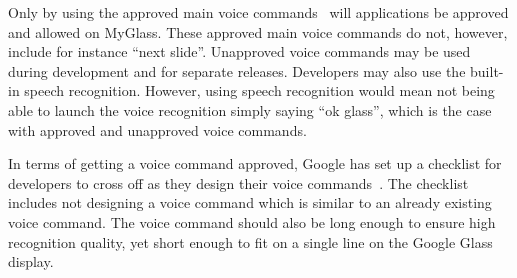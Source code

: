 Only by using the approved main voice commands~\cite{existingVoiceCommands} will applications be approved and allowed on MyGlass. These approved main voice commands do not, however, include for instance ``next slide''. Unapproved voice commands may be used during development and for separate releases. Developers may also use the built-in speech recognition. However, using speech recognition would mean not being able to launch the voice recognition simply saying ``ok glass'', which is the case with approved and unapproved voice commands.

In terms of getting a voice command approved, Google has set up a checklist for developers to cross off as they design their voice commands~\cite{glassVoiceChecklist}. The checklist includes not designing a voice command which is similar to an already existing voice command. The voice command should also be long enough to ensure high recognition quality, yet short enough to fit on a single line on the Google Glass display.%